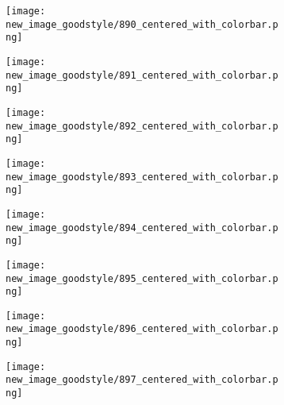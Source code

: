 \documentclass[a4paper,12pt]{article}
\begin{document}
\begin{figure}[H]
  \begin{subfigure}{0.11\textwidth}
    \texttt{[image: new\_image\_goodstyle/890\_centered\_with\_colorbar.png]}
  \end{subfigure}
  \hfill
  \begin{subfigure}{0.11\textwidth}
    \texttt{[image: new\_image\_goodstyle/891\_centered\_with\_colorbar.png]}
  \end{subfigure}
  \hfill
  \begin{subfigure}{0.11\textwidth}
    \texttt{[image: new\_image\_goodstyle/892\_centered\_with\_colorbar.png]}
  \end{subfigure}
  \hfill
  \begin{subfigure}{0.11\textwidth}
    \texttt{[image: new\_image\_goodstyle/893\_centered\_with\_colorbar.png]}
  \end{subfigure}
  \hfill
  \begin{subfigure}{0.11\textwidth}
    \texttt{[image: new\_image\_goodstyle/894\_centered\_with\_colorbar.png]}
  \end{subfigure}
  \hfill
  \begin{subfigure}{0.11\textwidth}
    \texttt{[image: new\_image\_goodstyle/895\_centered\_with\_colorbar.png]}
  \end{subfigure}
  \hfill
  \begin{subfigure}{0.11\textwidth}
    \texttt{[image: new\_image\_goodstyle/896\_centered\_with\_colorbar.png]}
  \end{subfigure}
  \hfill
  \begin{subfigure}{0.11\textwidth}
    \texttt{[image: new\_image\_goodstyle/897\_centered\_with\_colorbar.png]}
  \end{subfigure}
  \hfill
\end{figure}
\end{document}
